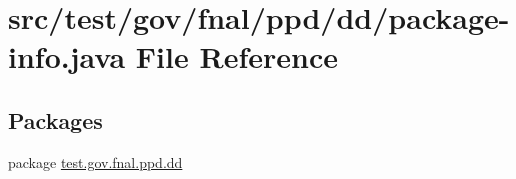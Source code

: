 \hypertarget{test_2gov_2fnal_2ppd_2dd_2package-info_8java}{\section{src/test/gov/fnal/ppd/dd/package-\/info.java File Reference}
\label{test_2gov_2fnal_2ppd_2dd_2package-info_8java}
}
\subsection*{Packages}
\begin{DoxyCompactItemize}
\item 
package \hyperlink{namespacetest_1_1gov_1_1fnal_1_1ppd_1_1dd}{test.\-gov.\-fnal.\-ppd.\-dd}
\end{DoxyCompactItemize}
